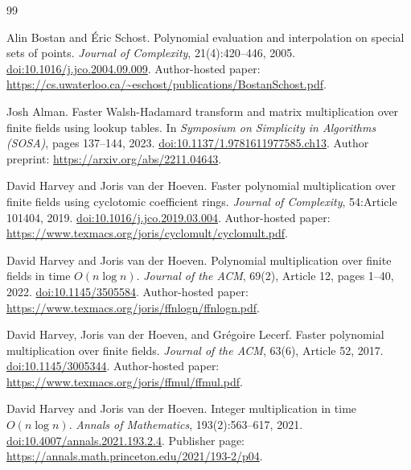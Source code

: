 \begingroup
\small
\raggedright
\begin{thebibliography}{99}

Alin Bostan and \'Eric Schost.
\newblock Polynomial evaluation and interpolation on special sets of points.
\newblock \emph{Journal of Complexity}, 21(4):420--446, 2005.
\newblock \href{https://doi.org/10.1016/j.jco.2004.09.009}{doi:10.1016/j.jco.2004.09.009}.
\newblock Author-hosted paper: \url{https://cs.uwaterloo.ca/~eschost/publications/BostanSchost.pdf}.

Josh Alman.
\newblock Faster Walsh-Hadamard transform and matrix multiplication over finite fields using lookup tables.
\newblock In \emph{Symposium on Simplicity in Algorithms (SOSA)}, pages 137--144, 2023.
\newblock \href{https://doi.org/10.1137/1.9781611977585.ch13}{doi:10.1137/1.9781611977585.ch13}.
\newblock Author preprint: \url{https://arxiv.org/abs/2211.04643}.

David Harvey and Joris van der Hoeven.
\newblock Faster polynomial multiplication over finite fields using cyclotomic coefficient rings.
\newblock \emph{Journal of Complexity}, 54:Article 101404, 2019.
\newblock \href{https://doi.org/10.1016/j.jco.2019.03.004}{doi:10.1016/j.jco.2019.03.004}.
\newblock Author-hosted paper: \url{https://www.texmacs.org/joris/cyclomult/cyclomult.pdf}.

David Harvey and Joris van der Hoeven.
\newblock Polynomial multiplication over finite fields in time $O(n\log n)$.
\newblock \emph{Journal of the ACM}, 69(2), Article 12, pages 1--40, 2022.
\newblock \href{https://doi.org/10.1145/3505584}{doi:10.1145/3505584}.
\newblock Author-hosted paper: \url{https://www.texmacs.org/joris/ffnlogn/ffnlogn.pdf}.

David Harvey, Joris van der Hoeven, and Gr\'egoire Lecerf.
\newblock Faster polynomial multiplication over finite fields.
\newblock \emph{Journal of the ACM}, 63(6), Article 52, 2017.
\newblock \href{https://doi.org/10.1145/3005344}{doi:10.1145/3005344}.
\newblock Author-hosted paper: \url{https://www.texmacs.org/joris/ffmul/ffmul.pdf}.

David Harvey and Joris van der Hoeven.
\newblock Integer multiplication in time $O(n\log n)$.
\newblock \emph{Annals of Mathematics}, 193(2):563--617, 2021.
\newblock \href{https://doi.org/10.4007/annals.2021.193.2.4}{doi:10.4007/annals.2021.193.2.4}.
\newblock Publisher page: \url{https://annals.math.princeton.edu/2021/193-2/p04}.


\end{thebibliography}
